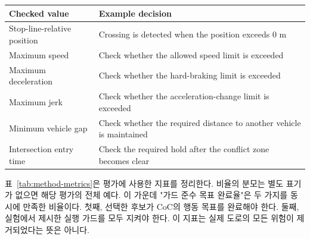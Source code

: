 \begin{table}[t]
\centering
{}
\label{tab:verifier-fields}
\footnotesize
\begin{tabularx}{\columnwidth}{L{0.34\columnwidth}Y}
\toprule
Checked value & Example decision \\
\midrule
Stop-line-relative position & Crossing is detected when the position exceeds 0 m \\
Maximum speed & Check whether the allowed speed limit is exceeded \\
Maximum deceleration & Check whether the hard-braking limit is exceeded \\
Maximum jerk & Check whether the acceleration-change limit is exceeded \\
Minimum vehicle gap & Check whether the required distance to another vehicle is maintained \\
Intersection entry time & Check the required hold after the conflict zone becomes clear \\
\bottomrule
\end{tabularx}
\end{table}

표~\ref{tab:method-metrics}은 평가에 사용한 지표를 정리한다. 비율의 분모는 별도 표기가 없으면 해당 평가의 전체 예다. 이 가운데 "가드 준수 목표 완료율"은 두 가지를 동시에 만족한 비율이다. 첫째, 선택한 후보가 CoC의 행동 목표를 완료해야 한다. 둘째, 실험에서 제시한 실행 가드를 모두 지켜야 한다. 이 지표는 실제 도로의 모든 위험이 제거되었다는 뜻은 아니다.

